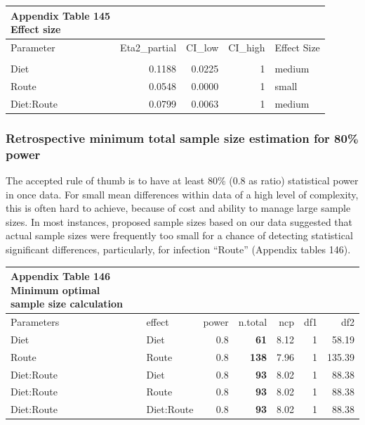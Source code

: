 \documentclass[
  12pt,
  letterpaper,
]{article}
\begin{document}
\begingroup
\fontsize{12.0pt}{14.4pt}\selectfont
\begin{longtable}{lrrrl}
\caption*{
{\large \textbf{Appendix Table 145}} \\ 
{\small \textbf{Effect size}}
} \\ 
\toprule
{Parameter} & Eta2\_partial & CI\_low & CI\_high & {Effect Size} \\ 
\midrule\addlinespace[2.5pt]
\multicolumn{5}{l}{Figure 4c} \\[2.5pt] 
\midrule\addlinespace[2.5pt]
Diet & 0.1188 & 0.0225 & 1 & medium \\ 
Route & 0.0548 & 0.0000 & 1 & small \\ 
Diet:Route & 0.0799 & 0.0063 & 1 & medium \\ 
\bottomrule
\end{longtable}
\endgroup

\subsubsection{Retrospective minimum total sample size estimation for 80\% power}\label{retrospective-minimum-total-sample-size-estimation-for-80-power-3}

The accepted rule of thumb is to have at least 80\% (0.8 as ratio) statistical power in once data. For small mean differences within data of a high level of complexity, this is often hard to achieve, because of cost and ability to manage large sample sizes. In most instances, proposed sample sizes based on our data suggested that actual sample sizes were frequently too small for a chance of detecting statistical significant differences, particularly, for infection ``Route'' (Appendix tables 146).

\begingroup
\fontsize{12.0pt}{14.4pt}\selectfont
\begin{longtable}{l|lrrrrr}
\caption*{
{\large \textbf{Appendix Table 146}} \\ 
{\small \textbf{Minimum optimal sample size calculation}}
} \\ 
\toprule
Parameters & {effect} & {power} & {n.total} & {ncp} & {df1} & {df2} \\ 
\midrule\addlinespace[2.5pt]
Diet & Diet & 0.8 & {\bfseries  61} & 8.12 & 1 &  58.19 \\ 
Route & Route & 0.8 & {\bfseries 138} & 7.96 & 1 & 135.39 \\ 
Diet:Route & Diet & 0.8 & {\bfseries  93} & 8.02 & 1 &  88.38 \\ 
Diet:Route & Route & 0.8 & {\bfseries  93} & 8.02 & 1 &  88.38 \\ 
Diet:Route & Diet:Route & 0.8 & {\bfseries  93} & 8.02 & 1 &  88.38 \\ 
\bottomrule
\end{longtable}
\endgroup
\end{document}

